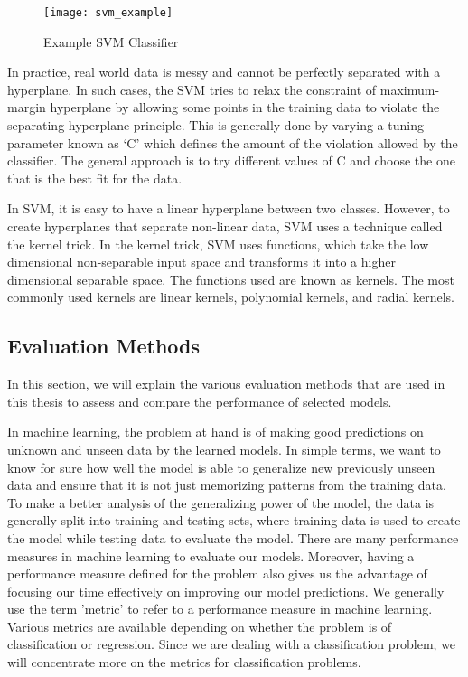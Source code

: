 \documentclass[11pt,openright]{report}
\begin{document}
  \begin{figure}
	\centering
	\texttt{[image: svm\_example]}
	\caption{Example SVM Classifier}
	\label{fig:svm_example}
\end{figure} 

In practice, real world data is messy and cannot be perfectly separated with a hyperplane. In such cases, the SVM tries to relax the constraint of maximum-margin hyperplane by allowing some points in the training data to violate the separating hyperplane principle. This is generally done by varying a tuning parameter known as `C' which defines the amount of the violation allowed by the classifier. The general approach is to try different values of C and choose the one that is the best fit for the data.

In SVM, it is easy to have a linear hyperplane between two classes. However, to create hyperplanes that separate non-linear data, SVM uses a technique called the kernel trick. In the kernel trick, SVM uses functions, which take the low dimensional non-separable input space and transforms it into a higher dimensional separable space. The functions used are known as kernels. The most commonly used kernels are linear kernels, polynomial kernels, and radial kernels. 

\subsection {Evaluation Methods}
In this section, we will explain the various evaluation methods that are used in this thesis to assess and compare the performance of selected models.

In machine learning, the problem at hand is of making good predictions on unknown and unseen data by the learned models. In simple terms, we want to know for sure how well the model is able to generalize new previously unseen data and ensure that it is not just memorizing patterns from the training data. To make a better analysis of the generalizing power of the model, the data is generally split into training and testing sets, where training data is used to create the model while testing data to evaluate the model. There are many performance measures in machine learning to evaluate our models. Moreover, having a performance measure defined for the problem also gives us the advantage of focusing our time effectively on improving our model predictions. We generally use the term 'metric' to refer to a performance measure in machine learning. Various metrics are available depending on whether the problem is of classification or regression. Since we are dealing with a classification problem, we will concentrate more on the metrics for classification problems.
\end{document}
